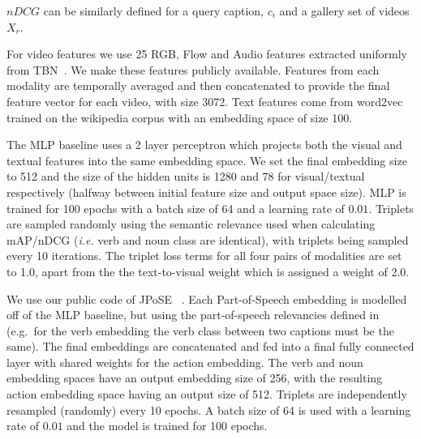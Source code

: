\documentclass[twocolumn]{svjour3}          \smartqed
\newcommand{\chParagraph}[1]{\noindent {\textbf{#1.}} \hspace{6pt}}
\begin{document}
$nDCG$ can be similarly defined for a query caption, $c_i$ and a gallery set of videos $X_r$.

\chParagraph{Implementation and Training Details}
For video features we use 25 RGB, Flow and Audio features extracted uniformly from TBN~\cite{kazakos2019epic}.
We make these features publicly available.
Features from each modality are temporally averaged and then concatenated to provide the final feature vector for each video, with size 3072.
Text features come from word2vec~\cite{mikolov2013efficient} trained on the wikipedia corpus with an embedding space of size 100.

The MLP baseline uses a 2 layer perceptron which projects both the visual and textual features into the same embedding space.
We set the final embedding size to 512 and the size of the hidden units is 1280 and 78 for visual/textual respectively (halfway between initial feature size and output space size).
MLP is trained for 100 epochs with a batch size of 64 and a learning rate of $0.01$.
Triplets are sampled randomly using the semantic relevance used when calculating mAP/nDCG (\emph{i.e.} verb and noun class are identical), with triplets being sampled every 10 iterations.
The triplet loss terms for all four pairs of modalities are set to 1.0, apart from the the text-to-visual weight which is assigned a weight of 2.0.

We use our public code of JPoSE~\cite{wray2019fine} . 
Each Part-of-Speech embedding is modelled off of the MLP baseline, but using the part-of-speech relevancies defined in~\cite{wray2019fine} (e.g.~for the verb embedding the verb class between two captions must be the same).
The final embeddings are concatenated and fed into a final fully connected layer with shared weights for the action embedding.
The verb and noun embedding spaces have an output embedding size of 256, with the resulting action embedding space having an output size of 512.
Triplets are independently resampled (randomly) every 10 epochs.
A batch size of 64 is used with a learning rate of $0.01$ and the model is trained for 100 epochs.
\end{document}
